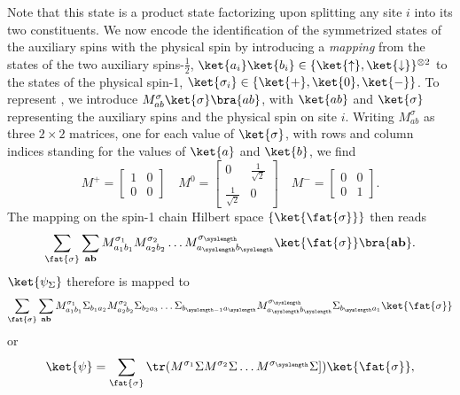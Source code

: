 Note that this state is a product state factorizing upon splitting any site $i$ into its two constituents. We now encode the identification of the symmetrized states of the auxiliary spins with the physical spin by introducing a {\em mapping} from the 
states of the two auxiliary spins-$\frac{1}{2}$, $\ket{a_i}\ket{b_i} \in \{ 
\ket{\uparrow},\ket{\downarrow}\}^{\otimes 2}$ to the states of the 
physical spin-1, $\ket{\sigma_i} \in \{ \ket{+},\ket{0},\ket{-} \}$. To represent , we introduce $M_{ab}^{\sigma} 
\ket{\sigma} \bra{ab}$, with $\ket{ab}$ and $\ket{\sigma}$ representing the auxiliary spins and the physical spin on site $i$. Writing $M_{ab}^{\sigma}$ as three $2\times 2$  matrices, one for each value of $\ket{\sigma}$, with rows and column indices standing for the values of $\ket{a}$ and $\ket{b}$, we find
\begin{equation}
    M^+ = \left[ \begin{array}{cc} 1 & 0 \\ 0 & 0 \end{array} \right] \quad
    M^0 = \left[ \begin{array}{cc} 0 & \frac{1}{\sqrt{2}} \\ 
    \frac{1}{\sqrt{2}} & 0 \end{array} \right] \quad
    M^- = \left[ \begin{array}{cc} 0 & 0 \\ 0 & 1 \end{array} \right] .
\end{equation}
The mapping on the spin-1 chain Hilbert space $\{ \ket{\fat{\sigma}} \}$ then reads
\begin{equation} 
\sum_{\fat{\sigma}} \sum_{{\bf a}{\bf b}} M^{\sigma_1}_{a_1 b_1} M^{\sigma_2}_{a_2 b_2} \ldots M^{\sigma_\syslength}_{a_\syslength b_\syslength}
\ket{\fat{\sigma}} \bra{{\bf a}{\bf b}} .
\end{equation}
$\ket{\psi_\Sigma}$ therefore is mapped to 
\begin{equation}
\sum_{\fat{\sigma}} \sum_{{\bf a}{\bf b}} M^{\sigma_1}_{a_1 b_1} \Sigma_{b_1 a_2}
M^{\sigma_2}_{a_2 b_2} \Sigma_{b_2 a_3} \ldots \Sigma_{b_{\syslength-1} a_\syslength} 
M^{\sigma_\syslength}_{a_\syslength b_\syslength} \Sigma_{b_\syslength a_1} 
\ket{\fat{\sigma}}
\end{equation}
or
\begin{equation}
    \ket{\psi} = \sum_{\fat{\sigma}} \tr (M^{\sigma_{1}} \Sigma
    M^{\sigma_{2}} \Sigma \ldots M^{\sigma_{\syslength}} \Sigma] ) \ket{\fat{\sigma}} ,
\end{equation}
